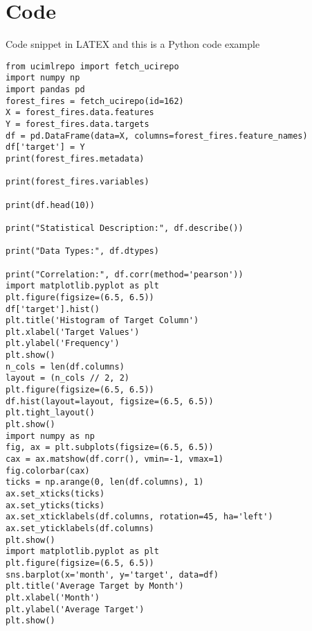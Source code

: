 \section{Code}
Code snippet in LATEX and this is a Python code example
\begin{lstlisting}
from ucimlrepo import fetch_ucirepo
import numpy np
import pandas pd
forest_fires = fetch_ucirepo(id=162)
X = forest_fires.data.features
Y = forest_fires.data.targets
df = pd.DataFrame(data=X, columns=forest_fires.feature_names)
df['target'] = Y
print(forest_fires.metadata)

print(forest_fires.variables)

print(df.head(10))

print("Statistical Description:", df.describe())

print("Data Types:", df.dtypes)

print("Correlation:", df.corr(method='pearson'))
import matplotlib.pyplot as plt
plt.figure(figsize=(6.5, 6.5))
df['target'].hist()
plt.title('Histogram of Target Column')
plt.xlabel('Target Values')
plt.ylabel('Frequency')
plt.show()
n_cols = len(df.columns)
layout = (n_cols // 2, 2)
plt.figure(figsize=(6.5, 6.5))
df.hist(layout=layout, figsize=(6.5, 6.5))
plt.tight_layout()
plt.show()
import numpy as np
fig, ax = plt.subplots(figsize=(6.5, 6.5))
cax = ax.matshow(df.corr(), vmin=-1, vmax=1)
fig.colorbar(cax)
ticks = np.arange(0, len(df.columns), 1)
ax.set_xticks(ticks)
ax.set_yticks(ticks)
ax.set_xticklabels(df.columns, rotation=45, ha='left')
ax.set_yticklabels(df.columns)
plt.show()
import matplotlib.pyplot as plt
plt.figure(figsize=(6.5, 6.5))
sns.barplot(x='month', y='target', data=df)
plt.title('Average Target by Month')
plt.xlabel('Month')
plt.ylabel('Average Target')
plt.show()
\end{lstlisting}


